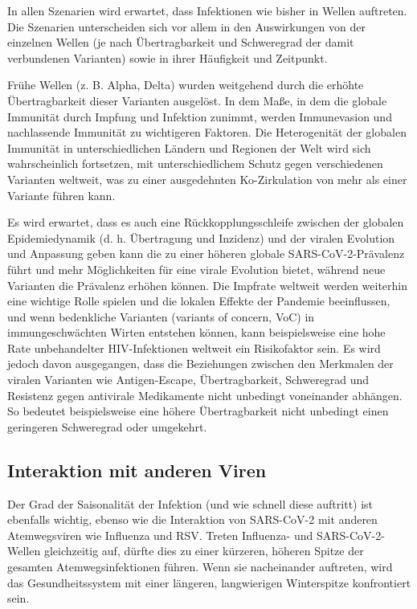 \documentclass{article}
\begin{document}
In allen Szenarien wird erwartet, dass Infektionen wie bisher in Wellen auftreten. Die Szenarien unterscheiden sich vor allem in den Auswirkungen von der einzelnen Wellen (je nach Übertragbarkeit und Schweregrad der damit verbundenen Varianten) sowie in ihrer Häufigkeit und Zeitpunkt.


Frühe Wellen (z. B. Alpha, Delta) wurden weitgehend durch die erhöhte Übertragbarkeit dieser Varianten ausgelöst. In dem Maße, in dem die globale Immunität durch Impfung und Infektion zunimmt, werden Immunevasion und nachlassende Immunität zu wichtigeren Faktoren. Die Heterogenität der globalen Immunität in unterschiedlichen Ländern und Regionen der Welt wird sich wahrscheinlich fortsetzen, mit unterschiedlichem Schutz gegen verschiedenen Varianten weltweit, was zu einer ausgedehnten Ko-Zirkulation von mehr als einer Variante führen kann. 


Es wird erwartet, dass es auch eine Rückkopplungsschleife zwischen der globalen Epidemiedynamik (d. h. Übertragung und Inzidenz) und der viralen Evolution und Anpassung geben kann die zu einer höheren globale SARS-CoV-2-Prävalenz führt und  mehr Möglichkeiten für eine virale Evolution bietet, während neue Varianten die Prävalenz erhöhen können. Die Impfrate weltweit werden weiterhin eine wichtige Rolle spielen und die lokalen Effekte der Pandemie beeinflussen, und wenn bedenkliche Varianten (variants of concern, VoC) in immungeschwächten Wirten entstehen können, kann beispielsweise eine hohe Rate unbehandelter HIV-Infektionen weltweit ein Risikofaktor sein. Es wird jedoch davon ausgegangen, dass die Beziehungen zwischen den Merkmalen der viralen Varianten wie Antigen-Escape, Übertragbarkeit, Schweregrad und Resistenz gegen antivirale Medikamente nicht unbedingt voneinander abhängen. So bedeutet beispielsweise eine höhere Übertragbarkeit nicht unbedingt einen geringeren Schweregrad oder umgekehrt. 


\subsection{Interaktion mit anderen Viren}\label{H2543508}



Der Grad der Saisonalität der Infektion (und wie schnell diese auftritt) ist ebenfalls wichtig, ebenso wie die Interaktion von SARS-CoV-2 mit anderen Atemwegsviren wie Influenza und RSV. Treten Influenza- und SARS-CoV-2-Wellen gleichzeitig auf, dürfte dies zu einer kürzeren, höheren Spitze der gesamten Atemwegsinfektionen führen. Wenn sie nacheinander auftreten, wird das Gesundheitssystem mit einer längeren, langwierigen Winterspitze konfrontiert sein. 
\end{document}
